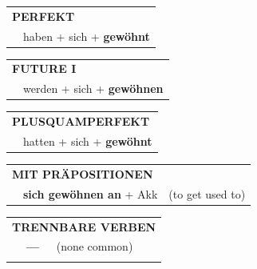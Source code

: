 \documentclass[10pt,a4paper]{revtex4-2}
\begin{document}
\begin{verbbox}
 \begin{tabular}{rl}
     \multicolumn{2}{l}{\textbf{PERFEKT}}\\
   & haben + sich + \textbf{gewöhnt}\\
  \end{tabular}
\hfill
   \begin{tabular}{rl}
    \multicolumn{2}{l}{\textbf{FUTURE I} }\\
   & werden + sich + \textbf{gewöhnen}\\
  \end{tabular}
\hfill
   \begin{tabular}{rl}
      \multicolumn{2}{l}{\textbf{PLUSQUAMPERFEKT}}\\
   & hatten + sich + \textbf{gewöhnt}\\
  \end{tabular}

   \vspace{10pt}

   \begin{tabular}{lll}
      \multicolumn{3}{l}{\textbf{MIT PRÄPOSITIONEN}}\\
& \textbf{sich gewöhnen an} + Akk & (to get used to)\\
\end{tabular}
  \hfill
   \begin{tabular}{lll}
      \multicolumn{3}{l}{\textbf{TRENNBARE VERBEN}}\\
 & \textbf{---} & (none common)\\
\vspace{10pt}
  \end{tabular}

  \vspace{-5pt}

\end{verbbox}
\end{document}
